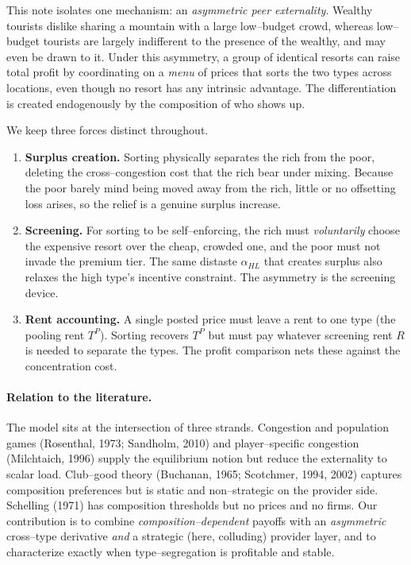 \documentclass[11pt]{article}
\theoremstyle{plain}
\theoremstyle{definition}
\theoremstyle{remark}
\newcommand{\aHL}{\alpha_{HL}}
\newcommand{\TP}{T^{P}}
\begin{document}
This note isolates one mechanism: an \emph{asymmetric peer externality}. Wealthy tourists
dislike sharing a mountain with a large low--budget crowd, whereas low--budget tourists are
largely indifferent to the presence of the wealthy, and may even be drawn to it. Under this
asymmetry, a group of identical resorts can raise total profit by coordinating on a
\emph{menu} of prices that sorts the two types across locations, even though no resort has any
intrinsic advantage. The differentiation is created endogenously by the composition of who
shows up.

We keep three forces distinct throughout.
\begin{enumerate}[label=(\roman*),leftmargin=2.4em]
\item \textbf{Surplus creation.} Sorting physically separates the rich from the poor, deleting
the cross--congestion cost that the rich bear under mixing. Because the poor barely mind being
moved away from the rich, little or no offsetting loss arises, so the relief is a genuine
surplus increase.
\item \textbf{Screening.} For sorting to be self--enforcing, the rich must \emph{voluntarily}
choose the expensive resort over the cheap, crowded one, and the poor must not invade the
premium tier. The same distaste $\aHL$ that creates surplus also relaxes the high type's
incentive constraint. The asymmetry is the screening device.
\item \textbf{Rent accounting.} A single posted price must leave a rent to one type (the
pooling rent $\TP$). Sorting recovers $\TP$ but must pay whatever screening rent $R$ is needed
to separate the types. The profit comparison nets these against the concentration cost.
\end{enumerate}

\paragraph{Relation to the literature.}
The model sits at the intersection of three strands. Congestion and population games
(Rosenthal, 1973; Sandholm, 2010) and player--specific congestion (Milchtaich, 1996) supply
the equilibrium notion but reduce the externality to scalar load. Club--good theory (Buchanan,
1965; Scotchmer, 1994, 2002) captures composition preferences but is static and non--strategic
on the provider side. Schelling (1971) has composition thresholds but no prices and no firms.
Our contribution is to combine \emph{composition--dependent} payoffs with an \emph{asymmetric}
cross--type derivative \emph{and} a strategic (here, colluding) provider layer, and to
characterize exactly when type--segregation is profitable and stable.
\end{document}
